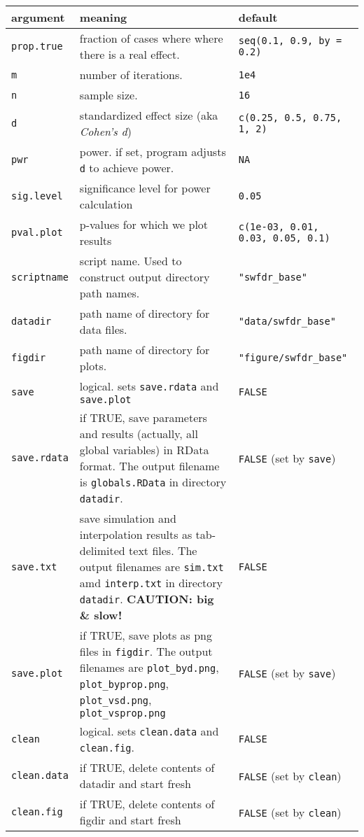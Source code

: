 \documentclass[]{article}
\begin{document}
\begingroup
\setlength{\tabcolsep}{10pt} \renewcommand{\arraystretch}{1.2}
\centering

\begin{tabular}{m{}m{}m{}}
\toprule
argument & meaning & default\\
\midrule
\texttt{prop.true} & fraction of cases where where there is a real effect. & \texttt{seq(0.1, 0.9, by = 0.2)} \\
\texttt{m} & number of iterations. & \texttt{1e4} \\
\texttt{n} & sample size. & \texttt{16} \\
\texttt{d} & standardized effect size (aka \textit{Cohen's d}) & \texttt{c(0.25, 0.5, 0.75, 1, 2)} \\
\texttt{pwr} & power. if set, program adjusts \texttt{d} to achieve power. & \texttt{NA} \\
\texttt{sig.level} & significance level for power calculation & \texttt{0.05} \\
\texttt{pval.plot} & p-values for which we plot results & \texttt{c(1e-03, 0.01, 0.03, 0.05, 0.1)} \\
\texttt{scriptname} & script name. Used to construct output directory path names. & \texttt{"swfdr\_base"} \\
\texttt{datadir} & path name of directory for data files. & \texttt{"data/swfdr\_base"} \\
\texttt{figdir} & path name of directory for plots. & \texttt{"figure/swfdr\_base"} \\
\texttt{save} & logical. sets \texttt{save.rdata} and \texttt{save.plot} & \texttt{FALSE} \\
\texttt{save.rdata} & if TRUE, save parameters and results (actually, all global variables) in RData format. The output filename is \texttt{globals.RData} in directory \texttt{datadir}. & \texttt{FALSE} (set by \texttt{save}) \\
\texttt{save.txt} & save simulation and interpolation results as tab-delimited text files. The output filenames are \texttt{sim.txt} amd \texttt{interp.txt} in directory \texttt{datadir}. \textbf{CAUTION: big \& slow!} & \texttt{FALSE} \\
\texttt{save.plot} & if TRUE, save plots as png files in \texttt{figdir}. The output filenames are \texttt{plot\_byd.png}, \texttt{plot\_byprop.png}, \texttt{plot\_vsd.png}, \texttt{plot\_vsprop.png} & \texttt{FALSE} (set by \texttt{save}) \\
\texttt{clean} & logical. sets \texttt{clean.data} and \texttt{clean.fig}. & \texttt{FALSE} \\
\texttt{clean.data} & if TRUE, delete contents of datadir and start fresh & \texttt{FALSE} (set by \texttt{clean}) \\
\texttt{clean.fig} & if TRUE, delete contents of figdir and start fresh & \texttt{FALSE} (set by \texttt{clean}) \\
\bottomrule
\end{tabular}
\end{document}
